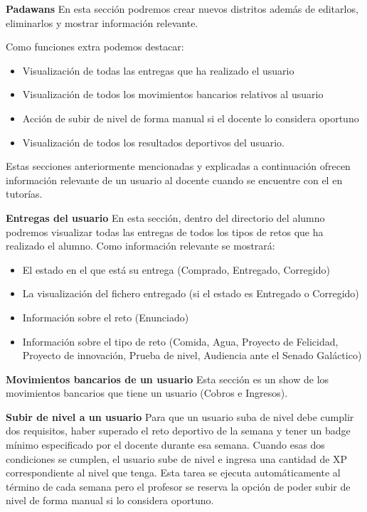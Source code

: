 \textbf{Padawans}
En esta sección podremos crear nuevos distritos además de editarlos, eliminarlos y mostrar información relevante.

Como funciones extra podemos destacar:
\begin{itemize}
	\item Visualización de todas las entregas que ha realizado el usuario
	\item Visualización de todos los movimientos bancarios relativos al usuario
	\item Acción de subir de nivel de forma manual si el docente lo considera oportuno
	\item Visualización de todos los resultados deportivos del usuario.
\end{itemize}

Estas secciones anteriormente mencionadas y explicadas a continuación ofrecen información relevante de un usuario al docente cuando se encuentre con el en tutorías.

\textbf{Entregas del usuario}
En esta sección, dentro del directorio del alumno podremos visualizar todas las entregas de todos los tipos de retos que ha realizado el alumno. Como información relevante se mostrará:

\begin{itemize}
	\item El estado en el que está su entrega (Comprado, Entregado, Corregido)
	\item La visualización del fichero entregado (si el estado es Entregado o Corregido)
	\item Información sobre el reto (Enunciado)
	\item Información sobre el tipo de reto (Comida, Agua, Proyecto de Felicidad, Proyecto de innovación, Prueba de nivel, Audiencia ante el Senado Galáctico)
\end{itemize}

\textbf{Movimientos bancarios de un usuario}
Esta sección es un show de los movimientos bancarios que tiene un usuario (Cobros e Ingresos).

\textbf{Subir de nivel a un usuario}
Para que un usuario suba de nivel debe cumplir dos requisitos, haber superado el reto deportivo de la semana y tener un badge mínimo especificado por el docente durante esa semana. Cuando esas dos condiciones se cumplen, el usuario sube de nivel e ingresa una cantidad de XP correspondiente al nivel que tenga. Esta tarea se ejecuta automáticamente al término de cada semana pero el profesor se reserva la opción de poder subir de nivel de forma manual si lo considera oportuno.

